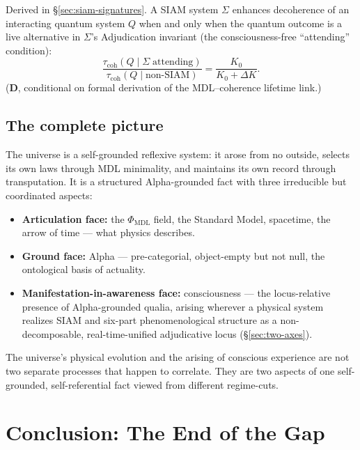 \documentclass[11pt]{article}
\theoremstyle{remark}
\newcommand{\PHIMDL}{\Phi_{\mathrm{MDL}}}
\newcommand{\CatD}{\textbf{D}}
\begin{document}
\begin{termlist}
  \item[SIAM conditional decoherence (\CatD)]
    Derived in \S\ref{sec:siam-signatures}. A SIAM system $\Sigma$ enhances
    decoherence of an interacting quantum system $Q$ when and only when the quantum
    outcome is a live alternative in $\Sigma$'s Adjudication invariant (the
    consciousness-free ``attending'' condition):
    \[
      \frac{\tau_\text{coh}(Q \mid \Sigma\;\text{attending})}
           {\tau_\text{coh}(Q \mid \text{non-SIAM})} = \frac{K_0}{K_0 + \Delta K}.
    \]
    (\CatD, conditional on formal derivation of the MDL--coherence lifetime link.)
\end{termlist}

\subsection{The complete picture}

The universe is a self-grounded reflexive system: it arose from no outside, selects
its own laws through MDL minimality, and maintains its own record through transputation.
It is a structured Alpha-grounded fact with three irreducible but coordinated aspects:

\begin{itemize}
  \item \textbf{Articulation face:} the $\PHIMDL$ field, the Standard Model,
    spacetime, the arrow of time --- what physics describes.
  \item \textbf{Ground face:} Alpha --- pre-categorial, object-empty but not null,
    the ontological basis of actuality.
  \item \textbf{Manifestation-in-awareness face:} consciousness --- the locus-relative
    presence of Alpha-grounded qualia, arising wherever a physical system realizes
    SIAM and six-part phenomenological structure as a non-decomposable,
    real-time-unified adjudicative locus (\S\ref{sec:two-axes}).
\end{itemize}

The universe's physical evolution and the arising of conscious experience are not two
separate processes that happen to correlate. They are two aspects of one self-grounded,
self-referential fact viewed from different regime-cuts.

\section{Conclusion: The End of the Gap}\label{sec:conclusion}
\end{document}
